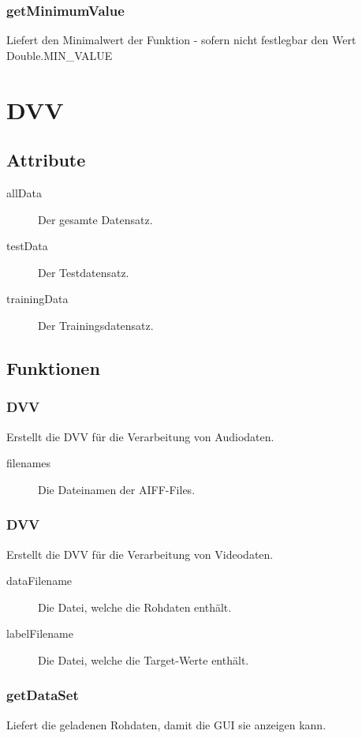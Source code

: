 \documentclass[a4paper,10pt]{scrartcl}
\begin{document}
\subsubsection{getMinimumValue}
Liefert den Minimalwert der Funktion - sofern nicht festlegbar
den Wert Double.MIN\_VALUE

\section{DVV}

\subsection{Attribute}

\begin{description}
\item[allData] Der gesamte Datensatz.
\item[testData] Der Testdatensatz.
\item[trainingData] Der Trainingsdatensatz.
\end{description}

\subsection{Funktionen}

\subsubsection{DVV}
Erstellt die DVV für die Verarbeitung von Audiodaten.
\begin{description}
\item[filenames] Die Dateinamen der AIFF-Files.
\end{description}

\subsubsection{DVV}
Erstellt die DVV für die Verarbeitung von Videodaten.
\begin{description}
\item[dataFilename] Die Datei, welche die Rohdaten enthält.
\item[labelFilename] Die Datei, welche die Target-Werte enthält.
\end{description}

\subsubsection{getDataSet}
Liefert die geladenen Rohdaten, damit die GUI sie anzeigen kann.
\end{document}
